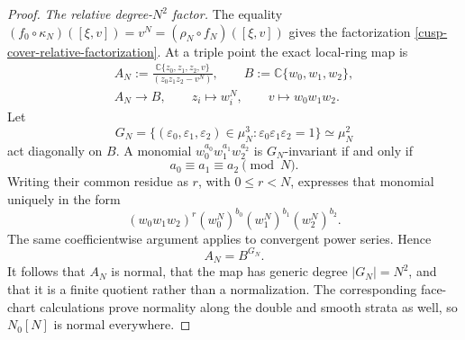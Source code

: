 \begin{proof}
\medskip\noindent
\emph{The relative degree-$N^2$ factor.}
The equality
\((f_0\circ\kappa_N)([\xi,v])=v^N=(\rho_N\circ f_N)([\xi,v])\)
gives the factorization
\eqref{cusp-cover-relative-factorization}.  At a triple point the exact
local-ring map is
\begin{equation}
 \begin{gathered}
 A_N:=
 \frac{\mathbb C\{z_0,z_1,z_2,v\}}
      {(z_0z_1z_2-v^N)},
 \qquad
 B:=\mathbb C\{w_0,w_1,w_2\},\\
 A_N\longrightarrow B,\qquad
 z_i\longmapsto w_i^N,\qquad
 v\longmapsto w_0w_1w_2.
 \end{gathered}
 \label{cusp-cover-basechange-local-ring}
\end{equation}
Let
\[
 G_N=\{(\varepsilon_0,\varepsilon_1,\varepsilon_2)\in\mu_N^3:
       \varepsilon_0\varepsilon_1\varepsilon_2=1\}
 \simeq\mu_N^2
\]
act diagonally on $B$.  A monomial
$w_0^{a_0}w_1^{a_1}w_2^{a_2}$ is $G_N$-invariant if and only if
\[
 a_0\equiv a_1\equiv a_2\pmod N.
\]
Writing their common residue as $r$, with $0\le r<N$, expresses that
monomial uniquely in the form
\[
 (w_0w_1w_2)^r
 (w_0^N)^{b_0}(w_1^N)^{b_1}(w_2^N)^{b_2}.
\]
The same coefficientwise argument applies to convergent power series.
Hence
\begin{equation}
 A_N=B^{G_N}.
 \label{cusp-cover-invariant-ring}
\end{equation}
It follows that $A_N$ is normal, that the map has generic degree
$|G_N|=N^2$, and that it is a finite quotient rather than a normalization.
The corresponding face-chart calculations prove normality along the
double and smooth strata as well, so $N_0[N]$ is normal everywhere.


\end{proof}
